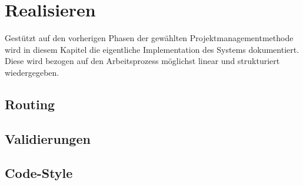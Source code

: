 \chapter{Realisieren} \label{ch:implement}

Gestützt auf den vorherigen Phasen der gewählten Projektmanagementmethode wird in diesem Kapitel die eigentliche Implementation des Systems dokumentiert.
Diese wird bezogen auf den Arbeitsprozess möglichst linear und strukturiert wiedergegeben.



\newpage





\section{Routing}













\section{Validierungen}

\section{Code-Style}
